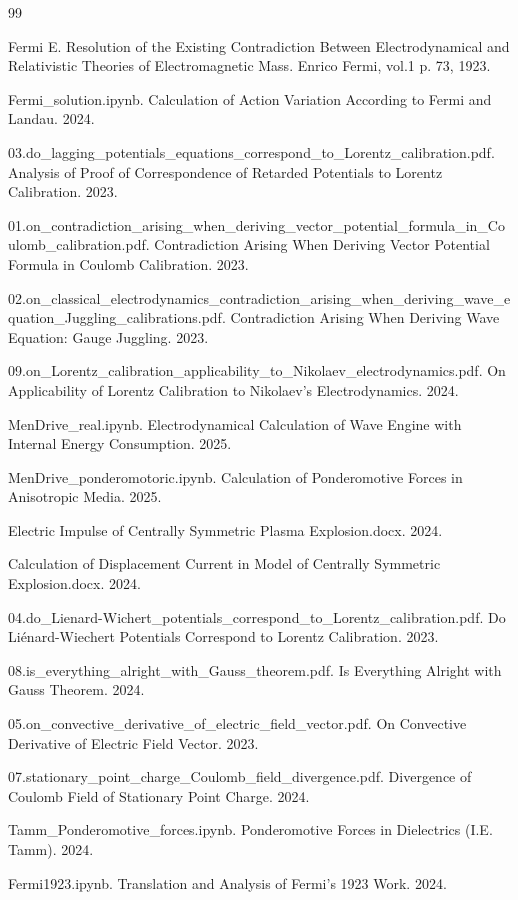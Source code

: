 \documentclass[12pt, a4paper]{article}
\begin{document}
\begin{thebibliography}{99}

Fermi E. Resolution of the Existing Contradiction Between Electrodynamical and Relativistic Theories of Electromagnetic Mass. Enrico Fermi, vol.1 p. 73, 1923.

Fermi\_solution.ipynb. Calculation of Action Variation According to Fermi and Landau. 2024.

03.do\_lagging\_potentials\_equations\_correspond\_to\_Lorentz\_calibration.pdf. Analysis of Proof of Correspondence of Retarded Potentials to Lorentz Calibration. 2023.

01.on\_contradiction\_arising\_when\_deriving\_vector\_potential\_formula\_in\_Coulomb\_calibration.pdf. Contradiction Arising When Deriving Vector Potential Formula in Coulomb Calibration. 2023.

02.on\_classical\_electrodynamics\_contradiction\_arising\_when\_deriving\_wave\_equation\_Juggling\_calibrations.pdf. Contradiction Arising When Deriving Wave Equation: Gauge Juggling. 2023.

09.on\_Lorentz\_calibration\_applicability\_to\_Nikolaev\_electrodynamics.pdf. On Applicability of Lorentz Calibration to Nikolaev's Electrodynamics. 2024.

MenDrive\_real.ipynb. Electrodynamical Calculation of Wave Engine with Internal Energy Consumption. 2025.

MenDrive\_ponderomotoric.ipynb. Calculation of Ponderomotive Forces in Anisotropic Media. 2025.

Electric Impulse of Centrally Symmetric Plasma Explosion.docx. 2024.

Calculation of Displacement Current in Model of Centrally Symmetric Explosion.docx. 2024.

04.do\_Lienard-Wichert\_potentials\_correspond\_to\_Lorentz\_calibration.pdf. Do Liénard-Wiechert Potentials Correspond to Lorentz Calibration. 2023.

08.is\_everything\_alright\_with\_Gauss\_theorem.pdf. Is Everything Alright with Gauss Theorem. 2024.

05.on\_convective\_derivative\_of\_electric\_field\_vector.pdf. On Convective Derivative of Electric Field Vector. 2023.

07.stationary\_point\_charge\_Coulomb\_field\_divergence.pdf. Divergence of Coulomb Field of Stationary Point Charge. 2024.

Tamm\_Ponderomotive\_forces.ipynb. Ponderomotive Forces in Dielectrics (I.E. Tamm). 2024.

Fermi1923.ipynb. Translation and Analysis of Fermi's 1923 Work. 2024.

\end{thebibliography}
\end{document}
